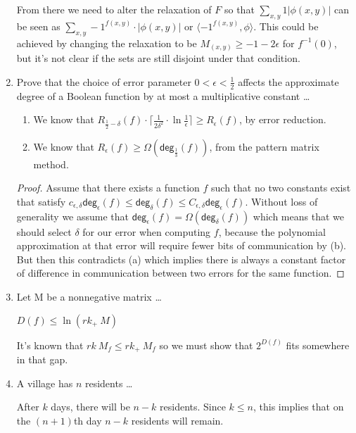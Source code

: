 \documentclass[usletter]{article}
\begin{document}
\begin{enumerate}
    From there we need to alter the relaxation of $F$ so that $\sum_{x,y} 1 |\phi(x,y)|$ can be seen as $\sum_{x,y} -1^{f(x,y)} \cdot |\phi(x,y)|$ or $\langle -1^{f(x,y)}, \phi \rangle$. This could be achieved by changing the relaxation to be $M_(x,y) \geq -1-2\epsilon$ for $f^{-1}(0)$, but it's not clear if the sets are still disjoint under that condition.

  \item Prove that the choice of error parameter $0 < \epsilon < \frac{1}{2}$ affects the approximate degree of a Boolean function by at most a multiplicative constant \ldots

    \begin{enumerate}
      \item We know that $R_{\frac{1}{2} - \delta}(f) \cdot \lceil \frac{1}{2\delta^2} \cdot \ln \frac{1}{\epsilon} \rceil \geq R_{\epsilon}(f)$, by error reduction.
      \item We know that $R_{\epsilon}(f) \geq \Omega(\mathsf{deg}_{\frac{1}{3}}(f))$, from the pattern matrix method.
    \end{enumerate}

    \begin{proof}
      Assume that there exists a function $f$ such that no two constants exist that satisfy $c_{\epsilon,\delta}\mathsf{deg}_{\epsilon}(f) \leq \mathsf{deg}_{\delta}(f) \leq C_{\epsilon,\delta}\mathsf{deg}_{\epsilon}(f)$. Without loss of generality we assume that $\mathsf{deg}_{\epsilon}(f) = \Omega(\mathsf{deg}_{\delta}(f))$ which means that we should select $\delta$ for our error when computing $f$, because the polynomial approximation at that error will require fewer bits of communication by (b). But then this contradicts (a) which implies there is always a constant factor of difference in communication between two errors for the same function.
    \end{proof}


  \item Let M be a nonnegative matrix \ldots

    \begin{claim}
      $D(f) \leq \ln(rk_+\ M)$
    \end{claim}

    It's known that $rk\ M_f \leq rk_+\ M_f$ \cite{wikipedia} so we must show that $2^{D(f)}$ fits somewhere in that gap.

  \item A village has $n$ residents \ldots

    \begin{claim}
      After $k$ days, there will be $n - k$ residents. Since $k \leq n$, this implies that on the $(n + 1)$th day $n - k$ residents will remain.
    \end{claim}


\end{enumerate}
\end{document}
